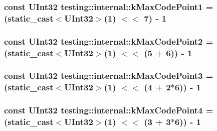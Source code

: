 \subsubsection[{k\+Max\+Code\+Point1}]{\setlength{\rightskip}{0pt plus 5cm}const {\bf U\+Int32} testing\+::internal\+::k\+Max\+Code\+Point1 = (static\+\_\+cast$<${\bf U\+Int32}$>$(1) $<$$<$ 7) -\/ 1}\label{namespacetesting_1_1internal_a128515c8ed6c0fe98e498c8042da2060}
\hypertarget{namespacetesting_1_1internal_ab8f4a5ed784352f00342cfeadc72337e}{}
\subsubsection[{k\+Max\+Code\+Point2}]{\setlength{\rightskip}{0pt plus 5cm}const {\bf U\+Int32} testing\+::internal\+::k\+Max\+Code\+Point2 = (static\+\_\+cast$<${\bf U\+Int32}$>$(1) $<$$<$ (5 + 6)) -\/ 1}\label{namespacetesting_1_1internal_ab8f4a5ed784352f00342cfeadc72337e}
\hypertarget{namespacetesting_1_1internal_aa42bd507418e570402996e33582beed3}{}
\subsubsection[{k\+Max\+Code\+Point3}]{\setlength{\rightskip}{0pt plus 5cm}const {\bf U\+Int32} testing\+::internal\+::k\+Max\+Code\+Point3 = (static\+\_\+cast$<${\bf U\+Int32}$>$(1) $<$$<$ (4 + 2$\ast$6)) -\/ 1}\label{namespacetesting_1_1internal_aa42bd507418e570402996e33582beed3}
\hypertarget{namespacetesting_1_1internal_acd87c60be9b5fedb2d017503d8834474}{}
\subsubsection[{k\+Max\+Code\+Point4}]{\setlength{\rightskip}{0pt plus 5cm}const {\bf U\+Int32} testing\+::internal\+::k\+Max\+Code\+Point4 = (static\+\_\+cast$<${\bf U\+Int32}$>$(1) $<$$<$ (3 + 3$\ast$6)) -\/ 1}\label{namespacetesting_1_1internal_acd87c60be9b5fedb2d017503d8834474}
\hypertarget{namespacetesting_1_1internal_a41bd421ace53d23dbe85d9618c3afaee}{}
